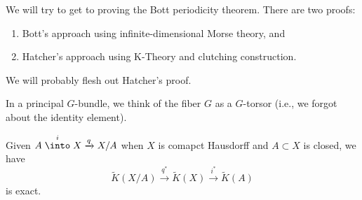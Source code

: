 
\lecture{}

\begin{node}
We will try to get to proving the Bott periodicity theorem. There are
two proofs:
\begin{enumerate}
\item Bott's approach using infinite-dimensional Morse theory, and
\item Hatcher's approach using K-Theory and clutching construction.
\end{enumerate}
We will probably flesh out Hatcher's proof.
\end{node}

\begin{remark}
In a principal $G$-bundle, we think of the fiber $G$ as a $G$-torsor
(i.e., we forgot about the identity element).
\end{remark}

\begin{proposition}
Given $A\stackrel{i}{\into}X\xrightarrow{q}X/A$ when $X$ is comapct
Hausdorff and $A\subset X$ is closed, we have
\begin{equation}
\widetilde{K}(X/A)\xrightarrow{q^{*}}\widetilde{K}(X)\xrightarrow{i^{*}}\widetilde{K}(A)
\end{equation}
is exact.
\end{proposition}

